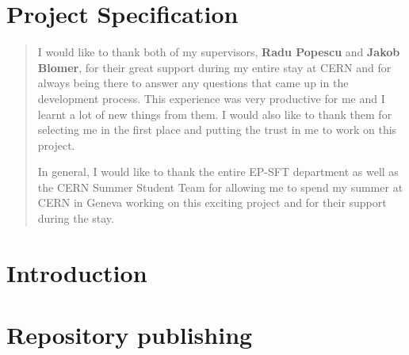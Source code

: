 \documentclass[a4paper,10pt,twoside]{report}
\author{\me}
\begin{document}



\normalsize

\newpage

\chapter*{\textcolor{OpenlabDarkBlue}{Project Specification} }\label{chapter:specification}


% 

\tableofcontents





\clearpage
\renewcommand{\abstractname}{Acknowledgements}
\begin{abstract}
\par
I would like to thank both of my supervisors, \textbf{Radu Popescu} and \textbf{Jakob Blomer}, for their great support during my entire stay at CERN and for always being there to answer any questions that came up in the development process. This experience was very productive for me and I learnt a lot of new things from them. I would also like to thank them for selecting me in the first place and putting the trust in me to work on this project.
\par
In general, I would like to thank the entire EP-SFT department as well as the CERN Summer Student Team for allowing me to spend my summer at CERN in Geneva working on this exciting project and for their support during the stay.
\end{abstract}
\setcounter{page}{10}

\chapter{Introduction}


\chapter{Repository publishing}

\end{document}
